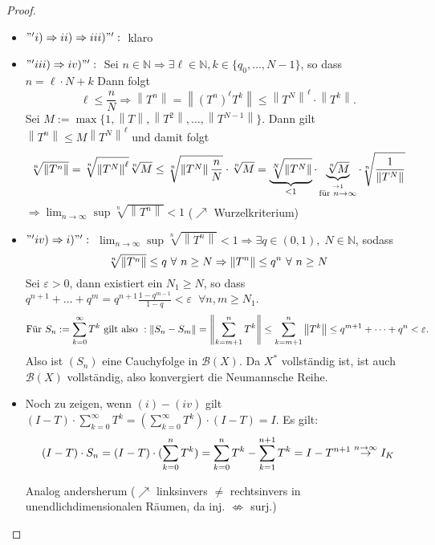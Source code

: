\documentclass[ngerman]{report}
\theoremstyle{plain}%
\theoremstyle{definition}%
\theoremstyle{myStyle}
\newcommand{\N}{\mathbb{N}}
\newcommand{\B}{\mathcal{B}} %
\newcommand{\norm}[1]{\left \|#1\right\| }
\newcommand{\df}[1][]{%
	\overset{#1}{\Rightarrow}
}
\newcommand{\limes}[1][\infty]{\lim_{n \to #1}}
\newcommand{\disp}{\displaystyle}
\newcommand{\qmarks}[1]{#1}
\newcommand{\spcm}[1][-0.8]{\vspace{#1 em}} %
\begin{document}
		\begin{proof}
			\begin{itemize}[]
				\item $ "' i)\df ii) \df iii)"':\;$ \qmarks{klaro}

				\item $"' iii) \df iv)"':\;$ Sei $n\in\N \df \exists \ell\in\N, k\in \{q_0,\dots,N-1\}$, 
					so dass $n = \ell \cdot N + k$ Dann folgt  
					$$\ell \leq \frac{n}{N} \df \norm{T^n} = \norm{(T^n)^\ell T^k} \leq \norm{T^N}^\ell \cdot \norm{T^k}. $$
					Sei $M := \max\{1,\norm{T},\norm{T^2},\dots,\norm{T^{N-1}}\}$.
					Dann gilt $\norm{T^n} \leq M\norm{T^N}^\ell$ und damit folgt
					\spcm[-0.75] $$ \sqrt[n]{\norm{T^n}} = \sqrt[n]{\norm{T^N}^\ell}\sqrt[n]{M}
					\leq \sqrt[n]{\norm{T^N} \frac{n}{N}} \cdot \sqrt[n]{M}
					 = \underbrace{\sqrt[N]{\norm{T^N}}}_{< 1} \cdot 
						\underbrace{\sqrt[n]{M}}_{\overset{\to 1}{\text{für } n\to\infty}} 
						\cdot \sqrt[n]{\frac{1}{\norm{T^N}}}\spcm[-1]$$
					$\disp \df \limes \sup \sqrt[n]{\norm{T^n}} < 1$   ($\nearrow$ Wurzelkriterium)

				\item $ "'iv) \df i)"': \;$ 
					$\disp \limes \sup \sqrt[n]{\norm{T^n}} < 1 \df \exists q \in (0,1), \; N \in \N$, sodass \spcm
					$$ \sqrt[n]{\norm{T^n}} \leq q ~\forall~ n \geq N \df \norm{T^n} \leq q^n ~\forall~ n \geq N \spcm[-0.6]$$	
					Sei $\varepsilon > 0$, dann existiert ein $N_1 \geq N$, so dass $q^{n+1} + \dots + q^m = q^{n+1} \frac{1-q^{m-1}}{1-q}< \varepsilon \;\; \forall n,m \geq N_1$.
					\spcm
					$$ \text{Für } S_n:=\sum_{k=0}^\infty T^k \text{ gilt also }:
					\norm{S_n-S_m}=\norm{\sum_{k=m+1}^n T^k}\leq \sum_{k=m+1}^n \norm{T^k} \leq q^{m+1}+\dots+q^n < \varepsilon. \spcm[-0.5]
					$$	
					Also ist $(S_n)$ eine Cauchyfolge in $\B(X)$. Da $X^{*}$ vollständig ist, ist auch $\B(X)$ vollständig, also konvergiert die Neumannsche Reihe.

			
			\item 
			Noch zu zeigen, wenn $(i) - (iv)$ gilt
				$(I - T) \cdot \sum_{k=0}^\infty T^k = (\sum_{k=0}^\infty T^k) \cdot (I-T) = I$.
			Es gilt: 
			\spcm[-0.4]
			$$(I-T) \cdot S_n = (I-T) \cdot (\sum_{k=0}^n T^k) = \sum_{k=0}^n T^k - \sum_{k=1}^{n+1} T^k = I-T^{n+1} \overset{n \to \infty}{\to} I_K \spcm[-0.4] $$
			
			Analog andersherum ($\nearrow$ linksinvers $ \neq $ rechtsinvers in unendlichdimensionalen Räumen, da inj. $\not\Leftrightarrow$ surj.)
			\end{itemize}
		\end{proof}
\end{document}
